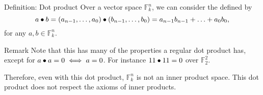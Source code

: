 \documentclass[a4paper]{article}
\begin{document}
\begin{parag}{Definition: Dot product}
    Over a vector space $\mathbb{F}_k^n$, we can consider the  defined by
    \[a \dotprod b = \left(a_{n-1}, \ldots, a_{0}\right) \dotprod \left(b_{n-1}, \ldots, b_0\right) = a_{n-1} b_{n-1} + \ldots + a_0 b_0,\]
    for any $a, b \in \mathbb{F}_{k}^n$.

    \begin{subparag}{Remark}
        Note that this has many of the properties a regular dot product has, except for $a \bullet a = 0 \iff a = 0$. For instance $11 \bullet 11 = 0$ over $\mathbb{F}_2^2$. 

        Therefore, even with this dot product, $\mathbb{F}_k^n$ is not an inner product space. This dot product does not respect the axioms of inner products.
    \end{subparag}
\end{parag}
\end{document}
